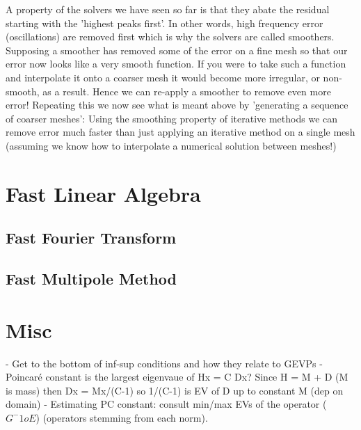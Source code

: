 A property of the solvers we have seen so far is that they abate the residual starting
with the 'highest peaks first'. In other words, high frequency error (oscillations) are
removed first which is why the solvers are called smoothers. Supposing a smoother has removed
some of the error on a fine mesh so that our error now looks like a very smooth function.
If you were to take such a function and interpolate it onto a coarser mesh it would
become more irregular, or non-smooth, as a result. Hence we can re-apply a smoother to
remove even more error! Repeating this we now see what is meant above by 'generating a
sequence of coarser meshes': Using the smoothing property of iterative methods we can
remove error much faster than just applying an iterative method on a single mesh (assuming
we know how to interpolate a numerical solution between meshes!)


\section{Fast Linear Algebra}

\subsection{Fast Fourier Transform}
\subsection{Fast Multipole Method}

\section{Misc}

- Get to the bottom of inf-sup conditions and how they relate to GEVPs -
Poincaré constant is the largest eigenvaue of Hx = C Dx? Since H = M + D (M is
mass) then Dx = Mx/(C-1) so  1/(C-1) is EV of D up to constant M (dep on domain)
- Estimating PC constant: consult min/max EVs of the operator ($G^-1 o E$)
(operators stemming from each norm).


